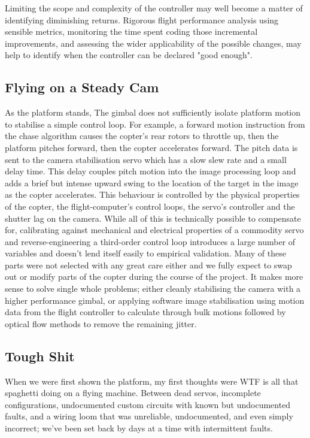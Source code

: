 \documentclass[11pt]{article}
\begin{document}
      Limiting the scope and complexity of the controller may well become a matter of identifying diminishing returns.  Rigorous flight performance analysis using sensible metrics, monitoring the time spent coding those incremental improvements, and assessing the wider applicability of the possible changes, may help to identify when the controller can be declared "good enough".


    \subsection{Flying on a Steady Cam}
    \label{sec:Camera Stability}
      As the platform stands, The gimbal does not sufficiently isolate platform motion to stabilise a simple control loop.
      For example, a forward motion instruction from the chase algorithm causes the copter's rear rotors to throttle up, then the platform pitches forward, then the copter accelerates forward.  The pitch data is sent to the camera stabilisation servo which has a slow slew rate and a small delay time.  This delay couples pitch motion into the image processing loop and adds a brief but intense upward swing to the location of the target in the image as the copter accelerates.
      This behaviour is controlled by the physical properties of the copter, the flight-computer's control loops, the servo's controller and the shutter lag on the camera. While all of this is technically possible to compensate for, calibrating against mechanical and electrical properties of a commodity servo and reverse-engineering a third-order control loop introduces a large number of variables and doesn't lend itself easily to empirical validation.  Many of these parts were not selected with any great care either and we fully expect to swap out or modify parts of the copter during the course of the project.
      It makes more sense to solve single whole problems; either cleanly stabilising the camera with a higher performance gimbal, or applying software image stabilisation using motion data from the flight controller to calculate through bulk motions followed by optical flow methods to remove the remaining jitter.


    \subsection{Tough Shit}
    \label{sec:Reliability}
      When we were first shown the platform, my first thoughts were WTF is all that spaghetti doing on a flying machine.
      Between dead servos, incomplete configurations, undocumented custom circuits with known but undocumented faults, and a wiring loom that was unreliable, undocumented, and even simply incorrect;  we've been set back by days at a time with intermittent faults.
\end{document}
